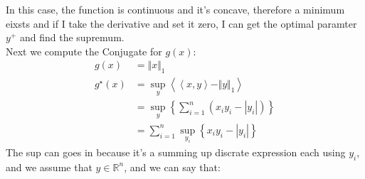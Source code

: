 \documentclass[]{article}
\begin{document}
    In this case, the function is continuous and it's concave, therefore a minimum eixsts and if I take the derivative and set it zero, I can get the optimal paramter $y^+$ and find the supremum. 
    \\
    Next we compute the Conjugate for $g(x)$: 
    \begin{align*}\tag{4.2.1.3}\label{eqn:4.2.1.3}
        g(x) &= \Vert x\Vert_1
        \\
        g^\star(x) &= 
        \sup_{y} \left\langle 
            \left\langle x, y \right\rangle - \Vert y\Vert_1
        \right\rangle
        \\
        &= 
        \sup_y \left\lbrace 
            \sum_{i = 1}^{n} (x_iy_i - |y_i|)
        \right\rbrace
        \\
        &= 
        \sum_{i = 1}^{n} \sup_{y_i} \left\lbrace
            x_iy_i - |y_i|
        \right\rbrace
    \end{align*}
    The sup can goes in because it's a summing up discrate expression each using $y_i$, and we assume that $y\in \mathbb{R}^n$, and we can say that:
\end{document}
